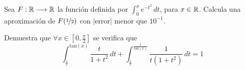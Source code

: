 \documentclass[12pt]{article}
\begin{document}
	\begin{ejercicio}[2 puntos]
		Sea $F:\mathbb{R}\longrightarrow\mathbb{R}$ la función definida por $\displaystyle \int_{0}^{x} e^{-t^2} \, dt$, para $x \in \mathbb{R}$. Calcula una aproximación de $F(\nicefrac{1}{2})$ con $|$error$|$ menor que $10^{-1}$.
	\end{ejercicio}
	
	\begin{ejercicio}[2 puntos]
		Demuestra que $\forall x \in [0, \frac{\pi}{2}]$ se verifica que
		$$ \int_{\frac{1}{e}}^{\text{tan}(x)} \frac{t}{1+t^2}\, dt + \int_{\frac{1}{e}}^{\frac{1}{\text{tan}(x)}} \frac{1}{t(1+t^2)}\, dt = 1$$
	\end{ejercicio}
	
	
	
	\newpage
	
	
	\setcounter{ejercicio}{0}
\end{document}
